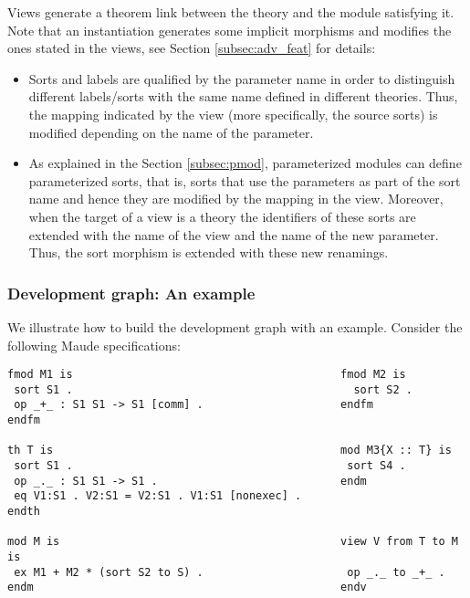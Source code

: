 Views generate a theorem
link between the theory and the module satisfying it.
Note that an instantiation generates some implicit morphisms and modifies
the ones stated in the views, see Section \ref{subsec:adv_feat} for details:
\begin{itemize}

\item
Sorts and labels are qualified by the parameter name in order to distinguish
different labels/sorts with the same name defined in different theories. Thus,
the mapping indicated by the view (more specifically, the source sorts) is
modified depending on the name of the parameter.

\item
As explained in the Section \ref{subsec:pmod}, parameterized modules can
define parameterized sorts, that is, sorts that use the parameters as part of
the sort name and hence they are modified by the mapping in the view.
Moreover, when the target of a view is a theory the identifiers of these sorts
are extended with the name of the view and the name of the new parameter.
%
Thus, the sort morphism is extended with these new renamings.

\end{itemize}



\subsubsection{Development graph: An example}

We illustrate how to build the development graph with an example. Consider
the following Maude specifications:

{\codesize
\begin{verbatim}
fmod M1 is                                         fmod M2 is
 sort S1 .                                           sort S2 .
 op _+_ : S1 S1 -> S1 [comm] .                     endfm
endfm

th T is                                            mod M3{X :: T} is
 sort S1 .                                          sort S4 .
 op _._ : S1 S1 -> S1 .                            endm
 eq V1:S1 . V2:S1 = V2:S1 . V1:S1 [nonexec] . 
endth

mod M is                                           view V from T to M is
 ex M1 + M2 * (sort S2 to S) .                      op _._ to _+_ .
endm                                               endv
\end{verbatim}
}


